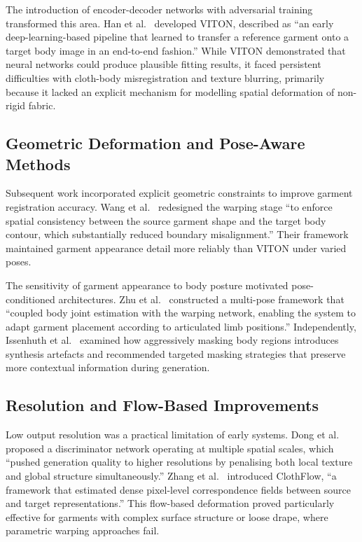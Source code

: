 \documentclass[conference]{IEEEtran}
\begin{document}
The introduction of encoder-decoder networks with adversarial training transformed this area. Han et al.~\cite{b1} developed VITON, described as ``an early deep-learning-based pipeline that learned to transfer a reference garment onto a target body image in an end-to-end fashion.'' While VITON demonstrated that neural networks could produce plausible fitting results, it faced persistent difficulties with cloth-body misregistration and texture blurring, primarily because it lacked an explicit mechanism for modelling spatial deformation of non-rigid fabric.

\subsection{Geometric Deformation and Pose-Aware Methods}

Subsequent work incorporated explicit geometric constraints to improve garment registration accuracy. Wang et al.~\cite{b2} redesigned the warping stage ``to enforce spatial consistency between the source garment shape and the target body contour, which substantially reduced boundary misalignment.'' Their framework maintained garment appearance detail more reliably than VITON under varied poses.

The sensitivity of garment appearance to body posture motivated pose-conditioned architectures. Zhu et al.~\cite{b4} constructed a multi-pose framework that ``coupled body joint estimation with the warping network, enabling the system to adapt garment placement according to articulated limb positions.'' Independently, Issenhuth et al.~\cite{b5} examined how aggressively masking body regions introduces synthesis artefacts and recommended targeted masking strategies that preserve more contextual information during generation.

\subsection{Resolution and Flow-Based Improvements}

Low output resolution was a practical limitation of early systems. Dong et al.~\cite{b3} proposed a discriminator network operating at multiple spatial scales, which ``pushed generation quality to higher resolutions by penalising both local texture and global structure simultaneously.'' Zhang et al.~\cite{b15} introduced ClothFlow, ``a framework that estimated dense pixel-level correspondence fields between source and target representations.'' This flow-based deformation proved particularly effective for garments with complex surface structure or loose drape, where parametric warping approaches fail.
\end{document}
